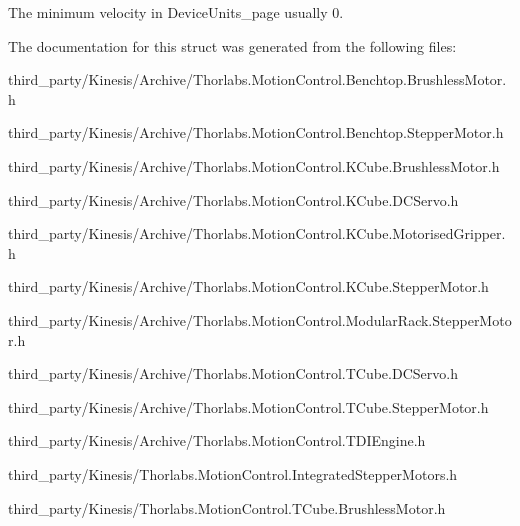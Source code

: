 The minimum velocity in Device\+Units\+\_\+page usually 0. 



The documentation for this struct was generated from the following files\+:\begin{DoxyCompactItemize}
\item 
third\+\_\+party/\+Kinesis/\+Archive/Thorlabs.\+Motion\+Control.\+Benchtop.\+Brushless\+Motor.\+h\item 
third\+\_\+party/\+Kinesis/\+Archive/Thorlabs.\+Motion\+Control.\+Benchtop.\+Stepper\+Motor.\+h\item 
third\+\_\+party/\+Kinesis/\+Archive/Thorlabs.\+Motion\+Control.\+K\+Cube.\+Brushless\+Motor.\+h\item 
third\+\_\+party/\+Kinesis/\+Archive/Thorlabs.\+Motion\+Control.\+K\+Cube.\+D\+C\+Servo.\+h\item 
third\+\_\+party/\+Kinesis/\+Archive/Thorlabs.\+Motion\+Control.\+K\+Cube.\+Motorised\+Gripper.\+h\item 
third\+\_\+party/\+Kinesis/\+Archive/Thorlabs.\+Motion\+Control.\+K\+Cube.\+Stepper\+Motor.\+h\item 
third\+\_\+party/\+Kinesis/\+Archive/Thorlabs.\+Motion\+Control.\+Modular\+Rack.\+Stepper\+Motor.\+h\item 
third\+\_\+party/\+Kinesis/\+Archive/Thorlabs.\+Motion\+Control.\+T\+Cube.\+D\+C\+Servo.\+h\item 
third\+\_\+party/\+Kinesis/\+Archive/Thorlabs.\+Motion\+Control.\+T\+Cube.\+Stepper\+Motor.\+h\item 
third\+\_\+party/\+Kinesis/\+Archive/Thorlabs.\+Motion\+Control.\+T\+D\+I\+Engine.\+h\item 
third\+\_\+party/\+Kinesis/Thorlabs.\+Motion\+Control.\+Integrated\+Stepper\+Motors.\+h\item 
third\+\_\+party/\+Kinesis/Thorlabs.\+Motion\+Control.\+T\+Cube.\+Brushless\+Motor.\+h\end{DoxyCompactItemize}
